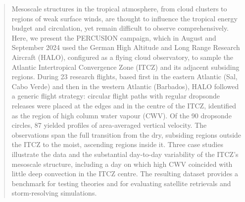 \documentclass[acp, manuscript]{copernicus}
\begin{document}
\begin{abstract}
Mesoscale structures in the tropical atmosphere, from cloud clusters to regions of weak surface winds, are thought to influence the tropical energy budget and circulation, yet remain difficult to observe comprehensively. Here, we present the PERCUSION campaign, which in August and September 2024 used the German High Altitude and Long Range Research Aircraft (HALO), configured as a flying cloud observatory, to sample the Atlantic Intertropical Convergence Zone (ITCZ) and its adjacent subsiding regions. During 23 research flights, based first in the eastern Atlantic (Sal, Cabo Verde) and then in the western Atlantic (Barbados), HALO followed a generic flight strategy: circular flight paths with regular dropsonde releases were placed at the edges and in the centre of the ITCZ, identified as the region of high column water vapour (CWV). Of the 90 dropsonde circles, 87 yielded profiles of area-averaged vertical velocity. The observations span the full transition from the dry, subsiding regions outside the ITCZ to the moist, ascending regions inside it. Three case studies illustrate the data and the substantial day-to-day variability of the ITCZ's mesoscale structure, including a day on which high CWV coincided with little deep convection in the ITCZ centre. The resulting dataset provides a benchmark for testing theories and for evaluating satellite retrievals and storm-resolving simulations.
\end{abstract}


\introduction  %

\end{document}
